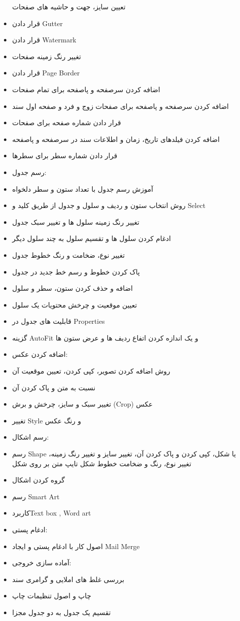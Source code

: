 \begin{itemize}
تعیین سایز، جهت و حاشیه های صفحات
\item
قرار دادن Gutter
\item
قرار دادن Watermark
\item
تغییر رنگ زمینه صفحات
\item
قرار دادن Page Border
\item
اضافه کردن سرصفحه و پاصفحه برای تمام صفحات
\item
اضافه کردن سرصفحه و پاصفحه برای صفحات زوج و فرد و صفحه اول سند
\item
قرار دادن شماره صفحه برای صفحات
\item
اضافه کردن فیلدهای تاریخ، زمان و اطلاعات سند در سرصفحه و پاصفحه
\item
قرار دادن شماره سطر برای سطرها
\item
رسم جدول:
\item
آموزش رسم جدول با تعداد ستون و سطر دلخواه
\item
روش انتخاب ستون و ردیف و سلول و جدول از طریق کلید و Select
\item
تغییر رنگ زمینه سلول ها و تغییر سبک جدول
\item
ادغام کردن سلول ها و تقسیم سلول به چند سلول دیگر
\item
تغییر نوع، ضخامت و رنگ خطوط جدول
\item
پاک کردن خطوط و رسم خط جدید در جدول
\item
اضافه و حذف کردن ستون، سطر و سلول
\item
تعیین موقعیت و چرخش محتویات یک سلول
\item
قابلیت های جدول در Properties
\item
گزینه AutoFit و یک اندازه کردن اتفاع ردیف ها و عرض ستون ها
\item
اضافه کردن عکس:
\item
روش اضافه کردن تصویر، کپی کردن، تعیین موقعیت آن
\item
نسبت به متن و پاک کردن آن
\item
تغییر سبک و سایز، چرخش و برش (Crop) عکس
\item
تغییر Style و رنگ عکس
\item
رسم اشکال:
\item
رسم Shape یا شکل، کپی کردن و پاک کردن آن، تغییر سایز و تغییر رنگ زمینه، تغییر نوع، رنگ و ضخامت خطوط شکل تایپ متن بر روی شکل
\item
گروه کردن اشکال
\item
رسم Smart Art
\item
کاربردText box , Word art
\item
ادغام پستی:
\item
اصول کار با ادغام پستی و ایجاد Mail Merge
\item
آماده سازی خروجی:
\item
بررسی غلط های املایی و گرامری سند
\item
چاپ و اصول تنظیمات چاپ
\item
تقسیم یک جدول به دو جدول مجزا
\end{itemize}